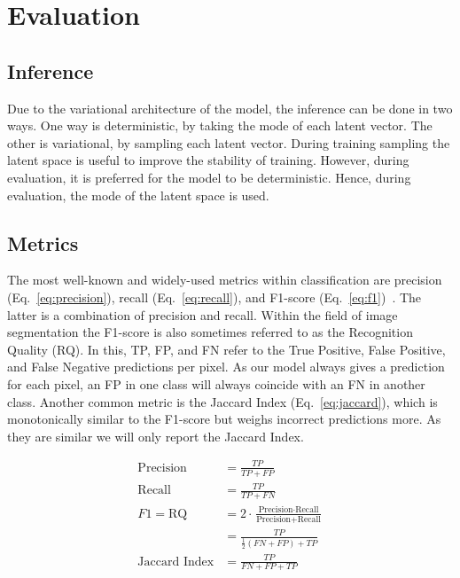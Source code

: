 \section{Evaluation}
\subsection{Inference}
Due to the variational architecture of the model, the inference can be done in two ways. One way is deterministic, by taking the mode of each latent vector. The other is variational, by sampling each latent vector. During training sampling the latent space is useful to improve the stability of training. However, during evaluation, it is preferred for the model to be deterministic. Hence, during evaluation, the mode of the latent space is used.

\subsection{Metrics}
The most well-known and widely-used metrics within classification are precision (Eq.~\ref{eq:precision}), recall (Eq.~\ref{eq:recall}), and F1-score (Eq.~\ref{eq:f1})~\cite{rijsbergen1979information}. The latter is a combination of precision and recall. Within the field of image segmentation the F1-score is also sometimes referred to as the Recognition Quality (RQ). In this, TP, FP, and FN refer to the True Positive, False Positive, and False Negative predictions per pixel. As our model always gives a prediction for each pixel, an FP in one class will always coincide with an FN in another class. Another common metric is the Jaccard Index (Eq.~\ref{eq:jaccard}), which is monotonically similar to the F1-score but weighs incorrect predictions more. As they are similar we will only report the Jaccard Index.

\begin{subequations}
    \begin{align}
        \text{Precision}     & = \frac{TP}{TP + FP} \label{eq:precision}                                               \\
        \text{Recall}        & = \frac{TP}{TP + FN} \label{eq:recall}                                                  \\
        F1 = \text{RQ}       & = 2 \cdot \frac{\text{Precision} \cdot \text{Recall}}{\text{Precision} + \text{Recall}} \\ 
                             & = \frac{TP}{\frac{1}{2} (FN + FP) + TP} \label{eq:f1}                                   \\
        \text{Jaccard Index} & = \frac{TP}{FN + FP + TP} \label{eq:jaccard}
    \end{align}
\end{subequations}
